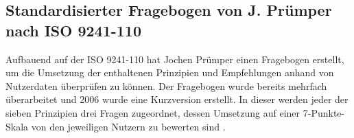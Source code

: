 \subsection{Standardisierter Fragebogen von J. Prümper nach ISO 9241-110}
\label{ch:SdF:UI:sec:ISO-Fragebogen}

Aufbauend auf der ISO 9241-110 hat Jochen Prümper einen Fragebogen erstellt, um die Umsetzung der enthaltenen Prinzipien und Empfehlungen anhand von Nutzerdaten überprüfen zu können. Der Fragebogen wurde bereits mehrfach überarbeitet und 2006 wurde eine Kurzversion erstellt. In dieser werden jeder der sieben Prinzipien drei Fragen zugeordnet, dessen Umsetzung auf einer 7-Punkte-Skala von den jeweiligen Nutzern zu bewerten sind \cites{Pruemper:Fragebogen:1997:Buch}[S. 258]{Pruemper:Fragebogen-S:2006:Paper}.

